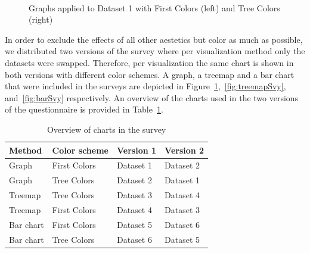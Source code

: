 \documentclass[journal]{vgtc}                %
\begin{document}
\begin{figure}[tb]
  \centering
  \mbox{
  }
  \caption{Graphs applied to Dataset 1 with First Colors (left) and Tree Colors (right)}\label{fig:graphSvy}

\end{figure}

In order to exclude the effects of all other aestetics but color as much as possible, we distributed two versions of the survey where per visualization method only the datasets were swapped. Therefore, per visualization the same chart is shown in both versions with different color schemes. A graph, a treemap and a bar chart that were included in the surveys are depicted in Figure~\ref{fig:graphSvy},~\ref{fig:treemapSvy}, and~\ref{fig:barSvy} respectively. An overview of the charts used in the two versions of the questionnaire is provided in Table~\ref{table:ques}.

\begin{table}[tb]
\begin{footnotesize}
\begin{tabular}{llll}
\toprule
Method & Color scheme & Version 1 & Version 2\\
\midrule
Graph & First Colors & Dataset 1 & Dataset 2\\
Graph & Tree Colors & Dataset 2 & Dataset 1\\
Treemap & Tree Colors & Dataset 3 & Dataset 4\\
Treemap & First Colors & Dataset 4 & Dataset 3\\
Bar chart & First Colors & Dataset 5 & Dataset 6\\
Bar chart & Tree Colors & Dataset 6 & Dataset 5\\
\bottomrule
\end{tabular}
\end{footnotesize}
\caption{Overview of charts in the survey}\label{table:ques}
\end{table}
\end{document}
